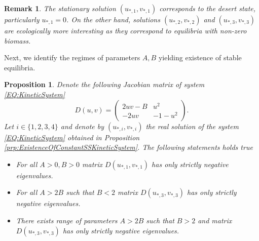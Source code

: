 \documentclass[12pt, a4paper]{article}
\theoremstyle{break}
\theoremstyle{break}
\newtheorem{prp}{Proposition}[section]
\theoremstyle{break}
\theoremstyle{break}
\newtheorem{rem}{Remark}[section]
\theoremstyle{break}
\theoremstyle{break}
\theoremstyle{break}
\begin{document}
\begin{rem}
    \label{rem:classification_steady_states}
    The stationary solution $(u_{*,1},v_{*,1})$ corresponds to the desert state, particularly $u_{*,1} = 0$. On the other hand, solutions $(u_{*,2},v_{*,2})$ and $(u_{*,3},v_{*,3})$ are ecologically more interesting as they correspond to equilibria with non-zero biomass.
\end{rem}

Next, we identify the regimes of parameters $A, B$ yielding existence of stable equilibria.

\begin{prp}
    \label{prp:StabilityOfConstanstKineticSystem}
    Denote the following Jacobian matrix of system \eqref{EQ:KineticSystem}
    \begin{equation}
        \label{EQ:JacobianOfConstantSystem}
        D(u, v) = \begin{pmatrix}
            2uv - B & u^2 \\ -2uv & -1 - u^2
        \end{pmatrix}.
    \end{equation}
    Let $i\in \{1,2,3,4\}$ and denote by $(u_{*,i}, v_{*, i})$ the real solution of the system \eqref{EQ:KineticSystem} obtained in Proposition \ref{prp:ExistenceOfConstantSSKineticSystem}. The following statements holds true
    \begin{itemize}
        \item For all $A >0, B > 0$ matrix $D(u_{*,1}, v_{*, 1})$ has only strictly negative eigenvalues.
        \item For all $A > 2 B$ such that $B < 2$ matrix $D(u_{*,3}, v_{*, 3})$ has only strictly negative eigenvalues.
        \item There exists range of parameters $A > 2 B$ such that $B > 2$ and matrix $D(u_{*,3}, v_{*, 3})$ has only strictly negative eigenvalues.
    \end{itemize}
\end{prp}
\end{document}
